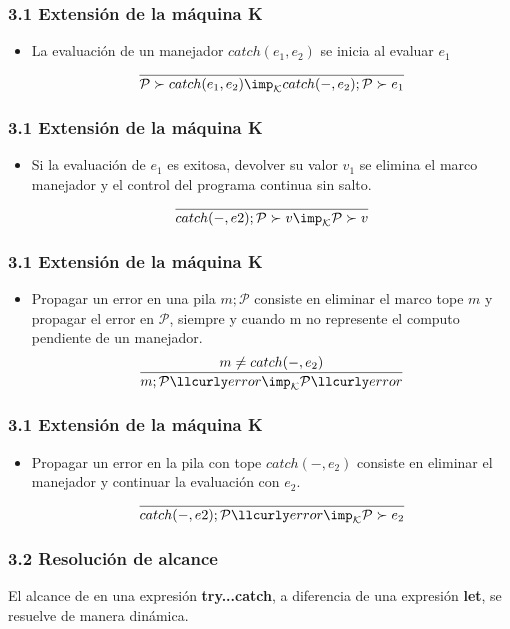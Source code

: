 \documentclass[xcolor=dvipsnames,table,spanish]{beamer}
\begin{document}
\begin{frame}
\frametitle{3.1 Extensión de la máquina K}
\begin{itemize}
		\item La evaluación de un manejador $catch(e_1,e_2)$ se inicia al evaluar $e_1$
        \[ \frac{}{\mathcal{P} \succ catch(e_1,e_2) \imp_{\mathcal{K}} catch(-,e_2);\mathcal{P} \succ e_1} \]
\end{itemize}
\end{frame}

\begin{frame}
\frametitle{3.1 Extensión de la máquina K}
\begin{itemize}
		\item Si la evaluación de $e_1$ es exitosa, devolver su valor $v_1$ se elimina el marco manejador y el control del programa continua sin salto.
        \[ \frac{}{catch(-,e2) ; \mathcal{P} \succ v \imp_{\mathcal{K}} \mathcal{P} \succ v} \]
\end{itemize}
\end{frame}

\begin{frame}
\frametitle{3.1 Extensión de la máquina K}
\begin{itemize}
		\item Propagar un error en una pila $m;\mathcal{P}$  consiste en eliminar el marco tope $m$ y propagar el error
en $\mathcal{P}$, siempre y cuando m no represente el computo pendiente de un manejador.
        \[ \frac{m \neq catch(-,e_2)}{m;\mathcal{P} \llcurly error \imp_{\mathcal{K}} \mathcal{P} \llcurly error} \]
\end{itemize}
\end{frame}

\begin{frame}
\frametitle{3.1 Extensión de la máquina K}
\begin{itemize}
		\item Propagar un error en la pila con tope $catch(-,e_2)$ consiste en eliminar el manejador y continuar la evaluación con $e_2$.
        \[ \frac{}{catch(-,e2);\mathcal{P} \llcurly error \imp_{\mathcal{K}} \mathcal{P} \succ e_2} \]
\end{itemize}
\end{frame}

\begin{frame}
\frametitle{3.2 Resolución de alcance}
El alcance de en una expresión \textbf{try...catch}, a diferencia de una expresión \textbf{let}, se resuelve de manera dinámica.

\end{frame}
\end{document}
